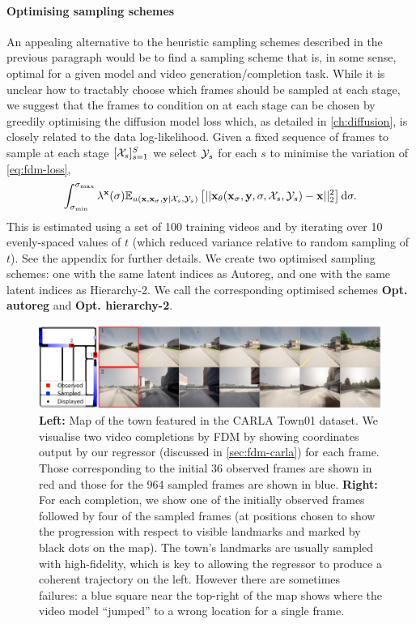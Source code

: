 \paragraph{Optimising sampling schemes}
An appealing alternative to the heuristic sampling schemes described in the previous paragraph would be to find a sampling scheme that is, in some sense, optimal for a given model and video generation/completion task. While it is unclear how to tractably choose which frames should be sampled at each stage, we suggest that the frames to condition on at each stage can be chosen by greedily optimising the diffusion model loss which, as detailed in \cref{ch:diffusion}, is closely related to the data log-likelihood. Given a fixed sequence of frames to sample at each stage $[\mathcal{X}_s]_{s=1}^S$ we select $\mathcal{Y}_s$ for each $s$ to minimise the variation of \cref{eq:fdm-loss},
\begin{align}
    \int_{\sigma_\text{min}}^{\sigma_\text{max}} \lambda^{\mathbf{x}}(\sigma) \mathbb{E}_{u({\mathbf{x}}, {\mathbf{x}}_\sigma, {\mathbf{y}}|{\mathcal{X}}_s, {\mathcal{Y}}_s)} \left[ 
    || {\mathbf{x}}_\theta({\mathbf{x}}_\sigma, {\mathbf{y}}, \sigma, {\mathcal{X}}_s, {\mathcal{Y}}_s) - {\mathbf{x}} ||_2^2 \right] \mathrm{d}\sigma.
\end{align}
This is estimated using a set of 100 training videos and by iterating over 10 evenly-spaced values of $t$ (which reduced variance relative to random sampling of $t$). See the appendix for further details. We create two optimised sampling schemes: one with the same latent indices as Autoreg, and one with the same latent indices as Hierarchy-2. We call the corresponding optimised schemes \textbf{Opt. autoreg} and \textbf{Opt. hierarchy-2}.


\begin{figure}
    \centering
    \includegraphics[width=1\textwidth]{figs/fdm/carla_map_7panel}
    \caption{\textbf{Left:} Map of the town featured in the CARLA Town01 dataset. We visualise two video completions by FDM by showing coordinates output by our regressor (discussed in \cref{sec:fdm-carla}) for each frame. Those corresponding to the initial 36 observed frames are shown in red and those for the 964 sampled frames are shown in blue. \textbf{Right:} For each completion, we show one of the initially observed frames followed by four of the sampled frames (at positions chosen to show the progression with respect to visible landmarks and marked by black dots on the map). The town's landmarks are usually sampled with high-fidelity, which is key to allowing the regressor  to produce a coherent trajectory on the left. However there are sometimes failures: a blue square near the top-right of the map shows where the video model ``jumped'' to a wrong location for a single frame.}
    \label{fig:carla}
\end{figure}


